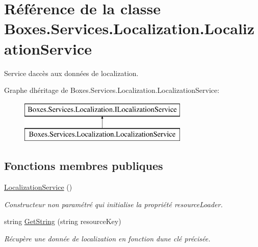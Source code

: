 \hypertarget{class_boxes_1_1_services_1_1_localization_1_1_localization_service}{}\section{Référence de la classe Boxes.\+Services.\+Localization.\+Localization\+Service}
\label{class_boxes_1_1_services_1_1_localization_1_1_localization_service}


Service d\textquotesingle{}accès aux données de localization.  


Graphe d\textquotesingle{}héritage de Boxes.\+Services.\+Localization.\+Localization\+Service\+:\begin{figure}[H]
\begin{center}
\leavevmode
\includegraphics[height=2.000000cm]{class_boxes_1_1_services_1_1_localization_1_1_localization_service}
\end{center}
\end{figure}
\subsection*{Fonctions membres publiques}
\begin{DoxyCompactItemize}
\item 
\hyperlink{class_boxes_1_1_services_1_1_localization_1_1_localization_service_a90c7f7f7c27f99b70fac67133a9828e3}{Localization\+Service} ()
\begin{DoxyCompactList}\small\item\em Constructeur non paramétré qui initialise la propriété {\ttfamily resource\+Loader}. \end{DoxyCompactList}\item 
string \hyperlink{class_boxes_1_1_services_1_1_localization_1_1_localization_service_aa27e8aeb522c8b4ab2f9005c887da842}{Get\+String} (string resource\+Key)
\begin{DoxyCompactList}\small\item\em Récupère une donnée de localization en fonction d\textquotesingle{}une clé précisée.  \end{DoxyCompactList}\end{DoxyCompactItemize}
